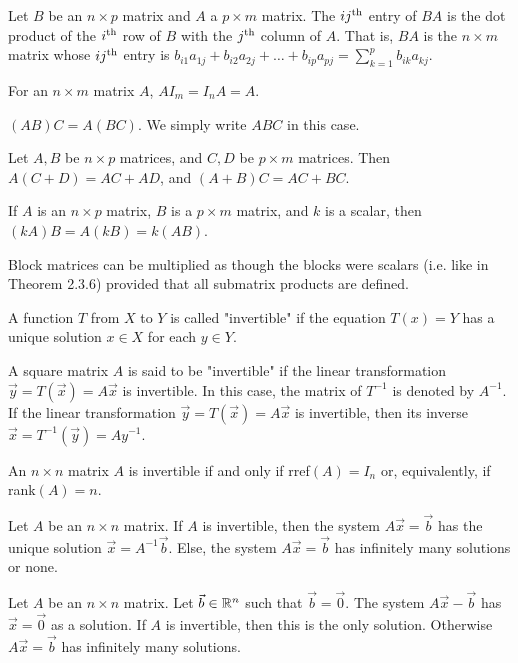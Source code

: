\documentclass[a4paper,8pt]{article}
\begin{document}
\begin{outline}
    Let \(B\) be an \(n \times p\) matrix and \(A\) a \(p \times m\) matrix. The \(ij\textsuperscript{th}\) entry
    of \(BA\) is the dot product of the \(i\textsuperscript{th}\) row of \(B\) with the \(j\textsuperscript{th}\) column
    of \(A\). That is, \(BA\) is the \(n \times m\) matrix whose \(ij\textsuperscript{th}\) entry is \(b_{i1}a_{1j} +
    b_{i2}a_{2j} + \ldots + b_{ip}a_{pj} = \sum_{k=1}^p b_{ik}a_{kj}\).

    For an \(n \times m\) matrix \(A\), \(AI_m = I_nA = A\).

    \((AB)C = A(BC)\). We simply write \(ABC\) in this case.

    Let \(A, B\) be \(n \times p\) matrices, and \(C,D\) be \(p \times m\) matrices. Then \(A(C + D) = AC + AD\),
    and \((A + B)C = AC + BC\).

    If \(A\) is an \(n \times p\) matrix, \(B\) is a \(p \times m\) matrix, and \(k\) is a scalar, then \((kA)B =
    A(kB) = k(AB)\).

    Block matrices can be multiplied as though the blocks were scalars (i.e. like in Theorem 2.3.6) provided
    that all submatrix products are defined.

    A function \(T\) from \(X\) to \(Y\) is called "invertible" if the equation \(T(x) = Y\) has a unique solution
    \(x \in X\) for each \(y \in Y\).

    A square matrix \(A\) is said to be "invertible" if the linear transformation \(\vec{y} = T(\vec{x}) = A\vec{x}\)
    is invertible. In this case, the matrix of \(T^{-1}\) is denoted by \(A^{-1}\). If the linear transformation
    \(\vec{y} = T(\vec{x}) = A\vec{x}\) is invertible, then its inverse \(\vec{x} = T^{-1}(\vec{y}) = Ay^{-1}\).

    An \(n \times n\) matrix \(A\) is invertible if and only if rref\((A) = I_n\) or, equivalently, if
    rank\((A) = n\).

    Let \(A\) be an \(n \times n\) matrix. If \(A\) is invertible, then the system \(A\vec{x}=\vec{b}\) has
    the unique solution \(\vec{x} = A^{-1}\vec{b}\). Else, the system \(A\vec{x} = \vec{b}\) has infinitely
    many solutions or none.

    Let \(A\) be an \(n \times n\) matrix. Let \(\vec{b} \in \mathbb{R}^n\) such that \(\vec{b} = \vec{0}\).
    The system \(A\vec{x} - \vec{b}\) has \(\vec{x} = \vec{0}\) as a solution. If \(A\) is invertible, then
    this is the only solution. Otherwise \(A\vec{x} = \vec{b}\) has infinitely many solutions.


\end{outline}
\end{document}
